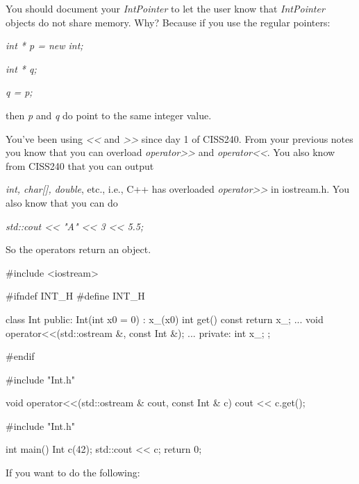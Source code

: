 You should document your \textit{IntPointer} to let the user know that
\textit{IntPointer} objects do not share memory. Why? Because if you use
the regular pointers:

\textit{int * p = new int;}

\textit{int * q;}

\textit{q = p;}

then \textit{p} and \textit{q} do point to the same integer value.




\newpage{}

You've been using \textit{<<} and
\textit{>>} since day 1 of CISS240. From your
previous notes you know that you can overload
\textit{operator>>} and
\textit{operator<<}. You also know from CISS240 that you
can output

\textit{int, char[], double}, etc., i.e., C++ has overloaded
\textit{operator>>} in iostream.h. You also know
that you can do

\textit{std::cout << "A" << 3 << 5.5;}

So the operators return an object.

\begin{consolethree}[escapeinside=||]
#include <iostream>

#ifndef INT_H
#define INT_H

class Int
{
public:
    Int(int x0 = 0) : x_(x0) {}
    int get() const { return x_; }
    ...
    void operator<<(std::ostream &, const Int &);
    ...
private:
    int x_;
};

#endif
\end{consolethree}

\begin{consolethree}[escapeinside=||]
#include "Int.h"

void operator<<(std::ostream & cout, const Int & c)
{
    cout << c.get();
}
\end{consolethree}

\begin{consolethree}[escapeinside=||]
#include "Int.h"

int main()
{
    Int c(42);
    std::cout << c;
    return 0;
}
\end{consolethree}


\newpage{}

If you want to do the following:

